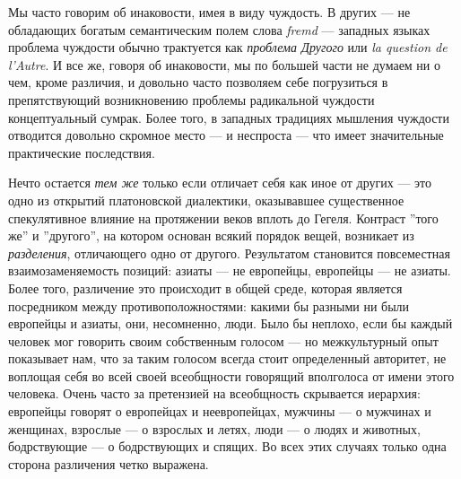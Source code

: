 \documentclass[12pt]{book}
\begin{document}
Мы часто говорим об инаковости, имея в виду чуждость. В других --- не обладающих богатым семантическим полем слова \textit{fremd} --- западных языках проблема чуждости обычно трактуется как \textit{проблема Другого} или \textit{la question de l’Autre}. И все же, говоря об инаковости, мы по большей части не думаем ни о чем, кроме различия, и довольно часто позволяем себе погрузиться в препятствующий возникновению проблемы радикальной чуждости концептуальный сумрак. Более того, в западных традициях мышления чуждости отводится довольно скромное место --- и неспроста --- что имеет значительные практические последствия.

Нечто остается \textit{тем же} только если отличает себя как иное от других --- это одно из открытий платоновской диалектики, оказывавшее существенное спекулятивное влияние на протяжении веков вплоть до Гегеля. Контраст ''того же'' и ''другого'', на котором основан всякий порядок вещей, возникает из \textit{разделения}, отличающего одно от другого. Результатом становится повсеместная взаимозаменяемость позиций: азиаты --- не европейцы, европейцы --- не азиаты. Более того, различение это происходит в общей среде, которая является посредником между противоположностями: какими бы разными ни были европейцы и азиаты, они, несомненно, люди. Было бы неплохо, если бы каждый человек мог говорить своим собственным голосом --- но межкультурный опыт показывает нам, что за таким голосом всегда стоит определенный авторитет, не воплощая себя во всей своей всеобщности говорящий вполголоса от имени этого человека. Очень часто за претензией на всеобщность скрывается иерархия: европейцы говорят о европейцах и неевропейцах, мужчины --- о мужчинах и женщинах, взрослые --- о взрослых и летях, люди --- о людях и животных, бодрствующие --- о бодрствующих и спящих. Во всех этих случаях только одна сторона различения четко выражена.
\end{document}
